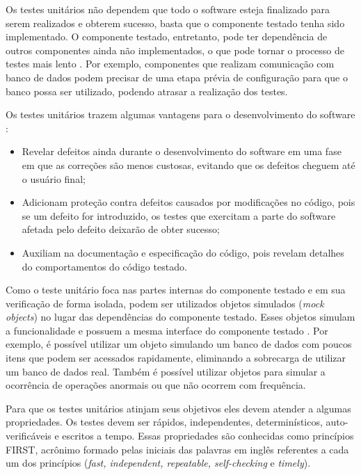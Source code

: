         Os testes unitários não dependem que todo o software esteja finalizado para serem realizados e obterem sucesso, basta que o componente testado tenha sido implementado. O componente testado, entretanto, pode ter dependência de outros componentes ainda não implementados, o que pode tornar o processo de testes mais lento \cite{sommerville2019}. Por exemplo, componentes que realizam comunicação com banco de dados podem precisar de uma etapa prévia de configuração para que o banco possa ser utilizado, podendo atrasar a realização dos testes.
        
        Os testes unitários trazem algumas vantagens para o desenvolvimento do software \cite{Valente2020}:
        
        \begin{itemize}
            \item Revelar defeitos ainda durante o desenvolvimento do software em uma fase em que as correções são menos custosas, evitando que os defeitos cheguem até o usuário final;
            \item Adicionam proteção contra defeitos causados por modificações no código, pois se um defeito for introduzido, os testes que exercitam a parte do software afetada pelo defeito deixarão de obter sucesso;
            \item Auxiliam na documentação e especificação do código, pois revelam detalhes do comportamentos do código testado.
        \end{itemize}

        Como o teste unitário foca nas partes internas do componente testado e em sua verificação de forma isolada, podem ser utilizados objetos simulados (\emph{mock objects}) no lugar das dependências do componente testado. Esses objetos simulam a funcionalidade e possuem a mesma interface do componente testado \cite{sommerville2019}. Por exemplo, é possível utilizar um objeto simulando um banco de dados com poucos itens que podem ser acessados rapidamente, eliminando a sobrecarga de utilizar um banco de dados real. Também é possível utilizar objetos para simular a ocorrência de operações anormais ou que não ocorrem com frequência.
        
        Para que os testes unitários atinjam seus objetivos eles devem atender a algumas propriedades. Os testes devem ser rápidos, independentes, determinísticos,  auto-verificáveis e escritos a tempo. Essas propriedades são conhecidas como princípios FIRST, acrônimo formado pelas iniciais das palavras em inglês referentes a cada um dos princípios  (\emph{fast, independent, repeatable, self-checking} e \emph{timely}).  
        
